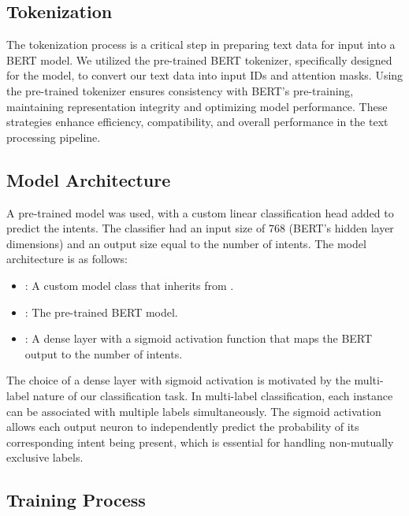     \subsection{Tokenization}

        The tokenization process is a critical step in preparing text data for input into a BERT model. We utilized the pre-trained BERT tokenizer, specifically designed for the  model, to convert our text data into input IDs and attention masks. Using the pre-trained tokenizer ensures consistency with BERT's pre-training, maintaining representation integrity and optimizing model performance. These strategies enhance efficiency, compatibility, and overall performance in the text processing pipeline.

    \subsection{Model Architecture}

        A pre-trained  model was used, with a custom linear classification head added to predict the intents. The classifier had an input size of 768 (BERT's hidden layer dimensions) and an output size equal to the number of intents. The model architecture is as follows:

        \begin{itemize}
        
            \item {}: A custom model class that inherits from .
            \item {}: The pre-trained BERT model.
            \item {}: A dense layer with a sigmoid activation function that maps the BERT output to the number of intents.
        
        \end{itemize}
        
        The choice of a dense layer with sigmoid activation is motivated by the multi-label nature of our classification task. In multi-label classification, each instance can be associated with multiple labels simultaneously. The sigmoid activation allows each output neuron to independently predict the probability of its corresponding intent being present, which is essential for handling non-mutually exclusive labels.

    \subsection{Training Process}

